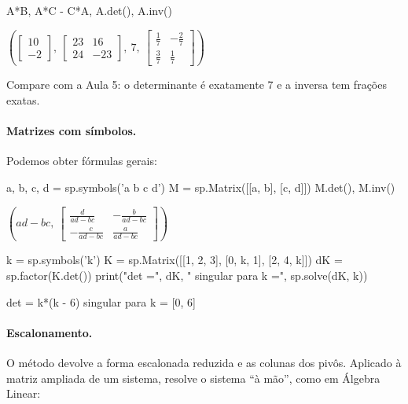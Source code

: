 \begin{entrada}
A*B, A*C - C*A, A.det(), A.inv()
\end{entrada}
\begin{saidamat}
$\displaystyle \left( \left[\begin{matrix}10\\-2\end{matrix}\right], \  \left[\begin{matrix}23 & 16\\24 & -23\end{matrix}\right], \  7, \  \left[\begin{matrix}\frac{1}{7} & - \frac{2}{7}\\\frac{3}{7} & \frac{1}{7}\end{matrix}\right]\right)$
\end{saidamat}

Compare com a Aula 5: o determinante é exatamente 7 e a inversa tem frações exatas.

\paragraph{Matrizes com símbolos.} Podemos obter fórmulas gerais:

\begin{entrada}
a, b, c, d = sp.symbols('a b c d')
M = sp.Matrix([[a, b], [c, d]])
M.det(), M.inv()
\end{entrada}
\begin{saidamat}
$\displaystyle \left( a d - b c, \  \left[\begin{matrix}\frac{d}{a d - b c} & - \frac{b}{a d - b c}\\- \frac{c}{a d - b c} & \frac{a}{a d - b c}\end{matrix}\right]\right)$
\end{saidamat}

\begin{entrada}
k = sp.symbols('k')
K = sp.Matrix([[1, 2, 3], [0, k, 1], [2, 4, k]])
dK = sp.factor(K.det())
print("det =", dK, "   singular para k =", sp.solve(dK, k))
\end{entrada}
\begin{saida}
det = k*(k - 6)    singular para k = [0, 6]
\end{saida}

\paragraph{Escalonamento.} O método  devolve a forma escalonada reduzida e as colunas dos pivôs. Aplicado
à matriz ampliada de um sistema, resolve o sistema ``à mão'', como em Álgebra Linear:

